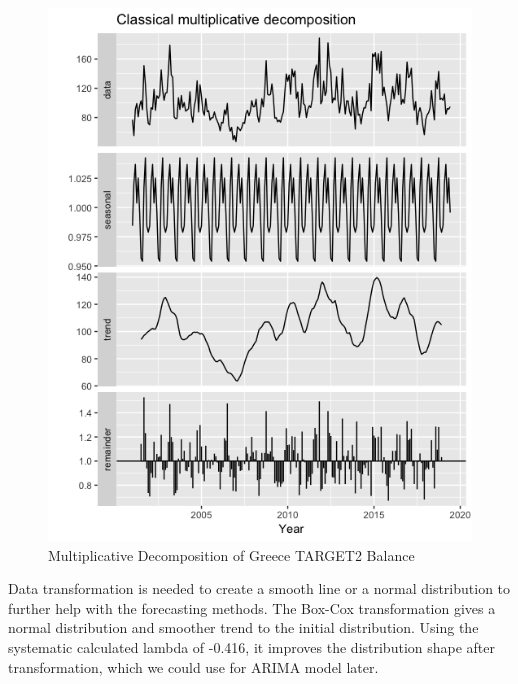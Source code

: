 \documentclass[12pt]{article}
\begin{document}
\begin{figure}[!tbp]
\begin{minipage}[b]{0.49\textwidth}
    \includegraphics[width=\textwidth]{Multiplicative.png}
    \caption{Multiplicative Decomposition of Greece TARGET2 Balance}
  \end{minipage}
\end{figure}

Data transformation is needed to create a smooth line or a normal distribution to further help with the forecasting methods. The Box-Cox transformation gives a normal distribution and smoother trend to the initial distribution. Using the systematic calculated lambda of -0.416, it improves the distribution shape after transformation, which we could use for ARIMA model later. 
\end{document}
